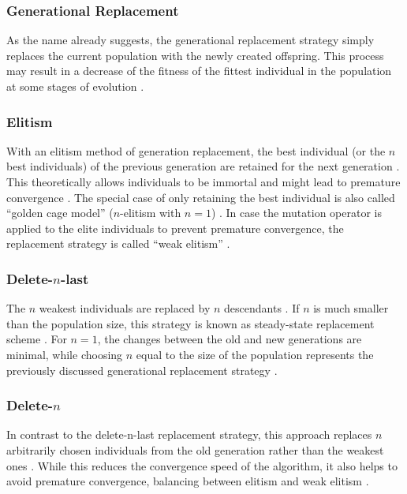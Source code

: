 \documentclass[sigconf]{acmart}
\begin{document}
\subsubsection{Generational Replacement}
\cite{Affenzeller2009}
As the name already suggests, the generational replacement strategy simply
replaces the current population with the newly created offspring.
This process may result in a decrease of the fitness of the fittest individual
in the population at some stages of evolution \cite{Affenzeller2009}.

\subsubsection{Elitism}
With an elitism method of generation replacement, the best individual
(or the $n$ best individuals) of the previous generation are retained for
the next generation \cite{Affenzeller2009, Katoch2021}.
This theoretically allows individuals to be immortal and might lead to
premature convergence \cite{Affenzeller2009}.
The special case of only retaining the best individual is also called
\enquote{golden cage model} ($n$-elitism with $n = 1$) \cite{Affenzeller2009}.
In case the mutation operator is applied to the elite individuals to prevent
premature convergence, the replacement strategy is called \enquote{weak elitism}
\cite{Affenzeller2009}.

\subsubsection{Delete-$n$-last}
The $n$ weakest individuals are replaced by $n$ descendants
\cite{Affenzeller2009}. If $n$ is much smaller than the population size, this
strategy is known as steady-state replacement scheme \cite{Affenzeller2009}.
For $n = 1$, the changes between the old and new generations are minimal, while
choosing $n$ equal to the size of the population represents the previously
discussed generational replacement strategy \cite{Affenzeller2009}.


\subsubsection{Delete-$n$}
In contrast to the delete-n-last replacement strategy, this approach replaces
$n$ arbitrarily chosen individuals from the old generation rather than the
weakest ones \cite{Affenzeller2009}.
While this reduces the convergence speed of the algorithm, it also helps to
avoid premature convergence, balancing between elitism and weak elitism
\cite{Affenzeller2009}.
\end{document}
